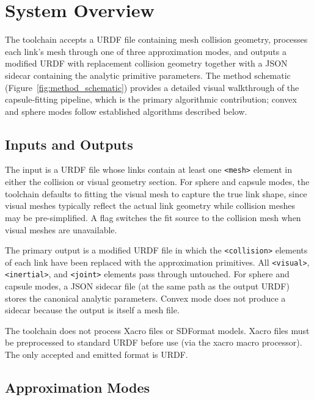 \section{System Overview}
\label{sec:overview}

The toolchain accepts a URDF file containing mesh collision geometry, processes each link's mesh through one of three approximation modes, and outputs a modified URDF with replacement collision geometry together with a JSON sidecar containing the analytic primitive parameters.
%
The method schematic (Figure~\ref{fig:method_schematic}) provides a detailed visual walkthrough of the capsule-fitting pipeline, which is the primary algorithmic contribution; convex and sphere modes follow established algorithms described below.

\subsection{Inputs and Outputs}

The input is a URDF file whose links contain at least one \texttt{<mesh>} element in either the collision or visual geometry section.
For sphere and capsule modes, the toolchain defaults to fitting the visual mesh to capture the true link shape, since visual meshes typically reflect the actual link geometry while collision meshes may be pre-simplified.
A flag switches the fit source to the collision mesh when visual meshes are unavailable.

The primary output is a modified URDF file in which the \texttt{<collision>} elements of each link have been replaced with the approximation primitives.
All \texttt{<visual>}, \texttt{<inertial>}, and \texttt{<joint>} elements pass through untouched.
For sphere and capsule modes, a JSON sidecar file (at the same path as the output URDF) stores the canonical analytic parameters.
Convex mode does not produce a sidecar because the output is itself a mesh file.

The toolchain does not process Xacro files or SDFormat models.
Xacro files must be preprocessed to standard URDF before use (via the xacro macro processor).
The only accepted and emitted format is URDF.

\subsection{Approximation Modes}

